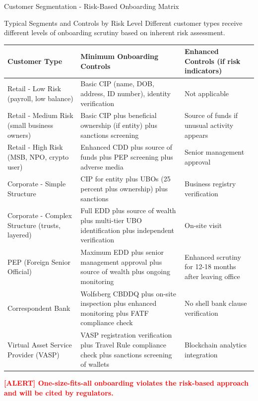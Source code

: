 \documentclass[11pt,a4paper]{beamer}
\newcommand{\redflag}[1]{\textcolor{red}{\textbf{[ALERT] #1}}}
\begin{document}
	\begin{frame}{Customer Segmentation - Risk-Based Onboarding Matrix}
		\begin{block}{Typical Segments and Controls by Risk Level}
			Different customer types receive different levels of onboarding scrutiny based on inherent risk assessment.
		\end{block}
		
		\begin{longtable}{p{}|p{}|p{}}
			\hline
			\rowcolor{lightgray}
			\textbf{Customer Type} & \textbf{Minimum Onboarding Controls} & \textbf{Enhanced Controls (if risk indicators)} \\
			\hline
			Retail - Low Risk (payroll, low balance) & Basic CIP (name, DOB, address, ID number), identity verification & Not applicable \\
			\hline
			Retail - Medium Risk (small business owners) & Basic CIP plus beneficial ownership (if entity) plus sanctions screening & Source of funds if unusual activity appears \\
			\hline
			Retail - High Risk (MSB, NPO, crypto user) & Enhanced CDD plus source of funds plus PEP screening plus adverse media & Senior management approval \\
			\hline
			Corporate - Simple Structure & CIP for entity plus UBOs (25 percent plus ownership) plus sanctions & Business registry verification \\
			\hline
			Corporate - Complex Structure (trusts, layered) & Full EDD plus source of wealth plus multi-tier UBO identification plus independent verification & On-site visit \\
			\hline
			PEP (Foreign Senior Official) & Maximum EDD plus senior management approval plus source of wealth plus ongoing monitoring & Enhanced scrutiny for 12-18 months after leaving office \\
			\hline
			Correspondent Bank & Wolfsberg CBDDQ plus on-site inspection plus enhanced monitoring plus FATF compliance check & No shell bank clause verification \\
			\hline
			Virtual Asset Service Provider (VASP) & VASP registration verification plus Travel Rule compliance check plus sanctions screening of wallets & Blockchain analytics integration \\
			\hline
		\end{longtable}
		
		\redflag{One-size-fits-all onboarding violates the risk-based approach and will be cited by regulators.}
	\end{frame}
	
\end{document}
